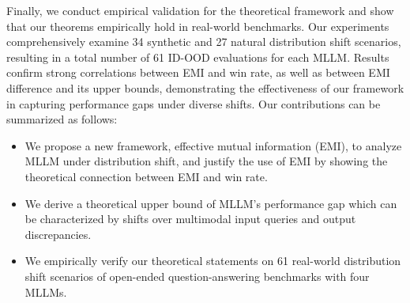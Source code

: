 Finally, we conduct empirical validation for the theoretical framework and show that our theorems empirically hold in real-world benchmarks. Our experiments comprehensively examine 34 synthetic and 27 natural distribution shift scenarios, resulting in a total number of 61 ID-OOD evaluations for each MLLM. Results confirm strong correlations between EMI and win rate, as well as between EMI difference and its upper bounds, demonstrating the effectiveness of our framework in capturing performance gaps under diverse shifts. Our contributions can be summarized as follows:
\begin{itemize}
    \item We propose a new framework, effective mutual information (EMI), to analyze MLLM under distribution shift, and justify the use of EMI by showing the theoretical connection between EMI and win rate.
    \vspace{-0.25em}
    \item We derive a theoretical upper bound of MLLM's performance gap which can be characterized by shifts over multimodal input queries and output discrepancies.
    \vspace{-0.25em}
    \item We empirically verify our theoretical statements on 61 real-world distribution shift scenarios of open-ended question-answering benchmarks with four MLLMs.
\end{itemize}